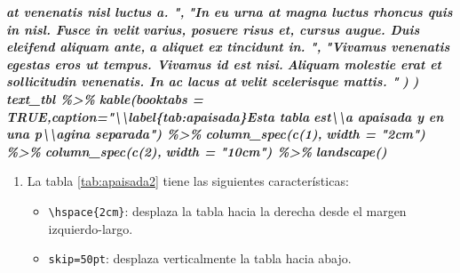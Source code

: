 \documentclass[12pt,a4paper,oneside,]{book}
\newenvironment{Shaded}{\begin{snugshade}}{\end{snugshade}}
\newcommand{\InformationTok}[1]{\textcolor[rgb]{0.56,0.35,0.01}{\textbf{\textit{#1}}}}
\providecommand{\tightlist}{%
  \setlength{\itemsep}{0pt}\setlength{\parskip}{0pt}}
\numberwithin{dummy}{section}
\theoremstyle{ocrenumbox}
\theoremstyle{blacknumex}
\theoremstyle{blacknumbox}
\theoremstyle{ocrenum}
\theoremstyle{ocrenum}
\begin{document}
\begin{Shaded}
\begin{Highlighting}[]
\InformationTok{    at venenatis nisl luctus a. ",}
\InformationTok{    "In eu urna at magna luctus rhoncus quis in nisl. Fusce in velit}
\InformationTok{    varius, posuere risus et, cursus augue. Duis eleifend aliquam ante,}
\InformationTok{    a aliquet ex tincidunt in. ",}
\InformationTok{    "Vivamus venenatis egestas eros ut tempus. Vivamus id est nisi.}
\InformationTok{    Aliquam molestie erat et sollicitudin venenatis. In ac lacus at}
\InformationTok{    velit scelerisque mattis. "}
\InformationTok{    ) }
\InformationTok{  )}
\InformationTok{text\_tbl \%\textgreater{}\%}
\InformationTok{  kable(booktabs = TRUE,caption="\textbackslash{}\textbackslash{}label\{tab:apaisada\}Esta tabla }
\InformationTok{          est\textbackslash{}\textbackslash{}\textquotesingle{}a apaisada y en una p\textbackslash{}\textbackslash{}\textquotesingle{}agina separada") \%\textgreater{}\% }
\InformationTok{      column\_spec(c(1), }
\InformationTok{          width = "2cm") \%\textgreater{}\% }
\InformationTok{      column\_spec(c(2), }
\InformationTok{          width = "10cm") \%\textgreater{}\% }
\InformationTok{      landscape()}
\InformationTok{\textasciigrave{}\textasciigrave{}\textasciigrave{}}
\end{Highlighting}
\end{Shaded}

\begin{enumerate}
\def\labelenumi{\arabic{enumi}.}
\setcounter{enumi}{1}
\item
  La tabla \ref{tab:apaisada2} tiene las siguientes características:

  \begin{itemize}
  \tightlist
  \item
    \texttt{\textbackslash{}hspace\{2cm\}}: desplaza la tabla hacia la
    derecha desde el margen izquierdo-largo.
  \item
    \texttt{skip=50pt}: desplaza verticalmente la tabla hacia abajo.
  \end{itemize}
\end{enumerate}
\end{document}
